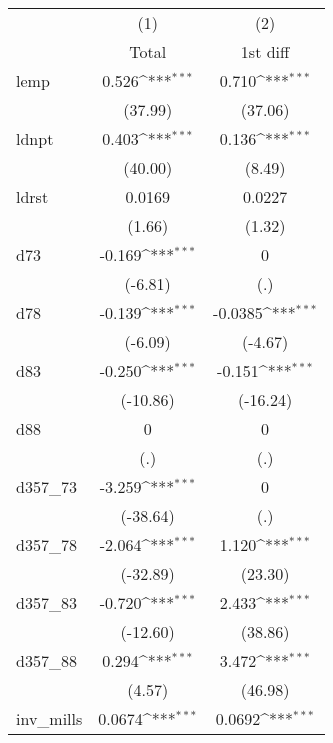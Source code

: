 {
\def\sym#1{\ifmmode^{#1}\else\(^{#1}\)\fi}
\begin{tabular}{l*{2}{c}}
\hline\hline
            &\multicolumn{1}{c}{(1)}&\multicolumn{1}{c}{(2)}\\
            &\multicolumn{1}{c}{Total}&\multicolumn{1}{c}{1st diff}\\
\hline
lemp        &       0.526\sym{***}&       0.710\sym{***}\\
            &     (37.99)         &     (37.06)         \\
[1em]
ldnpt       &       0.403\sym{***}&       0.136\sym{***}\\
            &     (40.00)         &      (8.49)         \\
[1em]
ldrst       &      0.0169         &      0.0227         \\
            &      (1.66)         &      (1.32)         \\
[1em]
d73         &      -0.169\sym{***}&           0         \\
            &     (-6.81)         &         (.)         \\
[1em]
d78         &      -0.139\sym{***}&     -0.0385\sym{***}\\
            &     (-6.09)         &     (-4.67)         \\
[1em]
d83         &      -0.250\sym{***}&      -0.151\sym{***}\\
            &    (-10.86)         &    (-16.24)         \\
[1em]
d88         &           0         &           0         \\
            &         (.)         &         (.)         \\
[1em]
d357\_73     &      -3.259\sym{***}&           0         \\
            &    (-38.64)         &         (.)         \\
[1em]
d357\_78     &      -2.064\sym{***}&       1.120\sym{***}\\
            &    (-32.89)         &     (23.30)         \\
[1em]
d357\_83     &      -0.720\sym{***}&       2.433\sym{***}\\
            &    (-12.60)         &     (38.86)         \\
[1em]
d357\_88     &       0.294\sym{***}&       3.472\sym{***}\\
            &      (4.57)         &     (46.98)         \\
[1em]
inv\_mills   &      0.0674\sym{***}&      0.0692\sym{***}\\

\end{tabular}}
